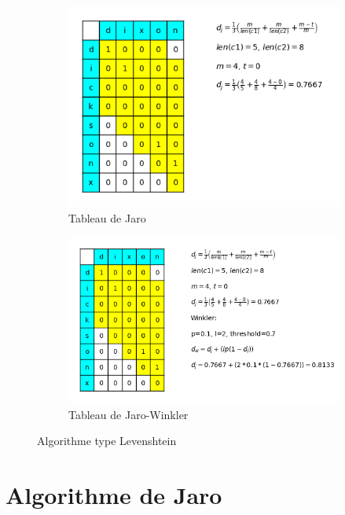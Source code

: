 \documentclass[final, 10pt]{report}
\begin{document}
\begin{figure}
    \centering
    \begin{subfigure}{0.4\textwidth}
        \includegraphics[width=.90\textwidth]{img/Table_de_Jaro.png}
        \caption{Tableau de Jaro}
        \label{fig:tab_jaro}
    \end{subfigure}
    \begin{subfigure}{0.4\textwidth}
        \includegraphics[width=.90\textwidth]{img/Table_de_Jaro-Winkler.png}
        \caption{Tableau de Jaro-Winkler}
        \label{fig:tab_winkler}
    \end{subfigure}
    \caption{Algorithme type Levenshtein}
    \label{fig:algo_jaro}
\end{figure}
    
\section{Algorithme de Jaro\cite{noauthor_distance_2021}}
    
\end{document}
